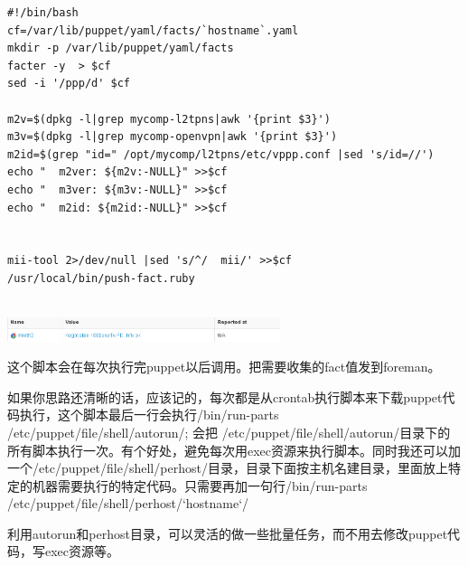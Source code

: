 \codefont\tiny \begin{lstlisting}
#!/bin/bash
cf=/var/lib/puppet/yaml/facts/`hostname`.yaml
mkdir -p /var/lib/puppet/yaml/facts
facter -y  > $cf
sed -i '/ppp/d' $cf

m2v=$(dpkg -l|grep mycomp-l2tpns|awk '{print $3}')
m3v=$(dpkg -l|grep mycomp-openvpn|awk '{print $3}')
m2id=$(grep "id=" /opt/mycomp/l2tpns/etc/vppp.conf |sed 's/id=//')
echo "  m2ver: ${m2v:-NULL}" >>$cf
echo "  m3ver: ${m3v:-NULL}" >>$cf
echo "  m2id: ${m2id:-NULL}" >>$cf


mii-tool 2>/dev/null |sed 's/^/  mii/' >>$cf
/usr/local/bin/push-fact.ruby


\end{lstlisting}
\fzsk\normalsize

\begin{center}
\includegraphics[width=0.6\textwidth]{2.png}
\end{center}
这个脚本会在每次执行完puppet以后调用。把需要收集的fact值发到foreman。

\par

如果你思路还清晰的话，应该记的，每次都是从crontab执行脚本来下载puppet代码执行，这个脚本最后一行会执行/bin/run-parts /etc/puppet/file/shell/autorun/; 会把 /etc/puppet/file/shell/autorun/目录下的所有脚本执行一次。有个好处，避免每次用exec资源来执行脚本。同时我还可以加一个/etc/puppet/file/shell/perhost/目录，目录下面按主机名建目录，里面放上特定的机器需要执行的特定代码。只需要再加一句行/bin/run-parts /etc/puppet/file/shell/perhost/`hostname`/

\par
利用autorun和perhost目录，可以灵活的做一些批量任务，而不用去修改puppet代码，写exec资源等。


